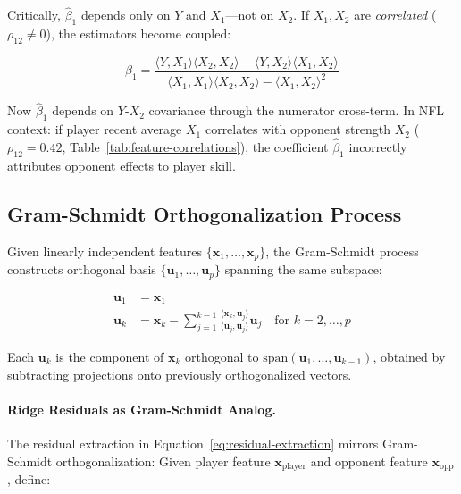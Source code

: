 Critically, $\hat{\beta}_1$ depends only on $Y$ and $X_1$---not on $X_2$. If $X_1, X_2$ are \emph{correlated} ($\rho_{12} \neq 0$), the estimators become coupled:

\begin{equation}
\hat{\beta}_1 = \frac{\langle Y, X_1 \rangle \langle X_2, X_2 \rangle - \langle Y, X_2 \rangle \langle X_1, X_2 \rangle}{\langle X_1, X_1 \rangle \langle X_2, X_2 \rangle - \langle X_1, X_2 \rangle^2}
\end{equation}

Now $\hat{\beta}_1$ depends on $Y$-$X_2$ covariance through the numerator cross-term. In NFL context: if player recent average $X_1$ correlates with opponent strength $X_2$ ($\rho_{12} = 0.42$, Table~\ref{tab:feature-correlations}), the coefficient $\hat{\beta}_1$ incorrectly attributes opponent effects to player skill.

\subsection{Gram-Schmidt Orthogonalization Process}

Given linearly independent features $\{\mathbf{x}_1, \ldots, \mathbf{x}_p\}$, the Gram-Schmidt process constructs orthogonal basis $\{\mathbf{u}_1, \ldots, \mathbf{u}_p\}$ spanning the same subspace:

\begin{equation}
\begin{aligned}
\mathbf{u}_1 &= \mathbf{x}_1 \\
\mathbf{u}_k &= \mathbf{x}_k - \sum_{j=1}^{k-1} \frac{\langle \mathbf{x}_k, \mathbf{u}_j \rangle}{\langle \mathbf{u}_j, \mathbf{u}_j \rangle} \mathbf{u}_j \quad \text{for } k = 2, \ldots, p
\end{aligned}
\label{eq:gram-schmidt}
\end{equation}

Each $\mathbf{u}_k$ is the component of $\mathbf{x}_k$ orthogonal to $\text{span}(\mathbf{u}_1, \ldots, \mathbf{u}_{k-1})$, obtained by subtracting projections onto previously orthogonalized vectors.

\paragraph{Ridge Residuals as Gram-Schmidt Analog.}
The residual extraction in Equation~\ref{eq:residual-extraction} mirrors Gram-Schmidt orthogonalization: Given player feature $\mathbf{x}_{\text{player}}$ and opponent feature $\mathbf{x}_{\text{opp}}$, define:

